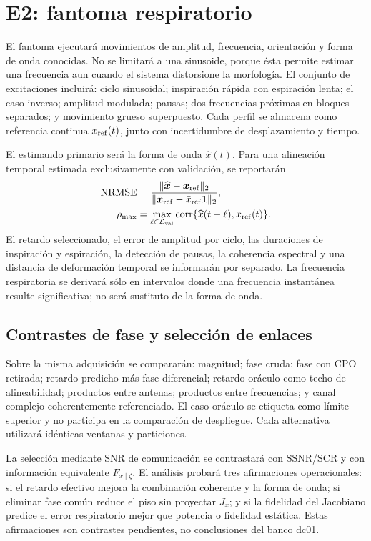 \section{E2: fantoma respiratorio}

El fantoma ejecutará movimientos de amplitud, frecuencia, orientación y forma de
onda conocidas. No se limitará a una sinusoide, porque ésta permite estimar una
frecuencia aun cuando el sistema distorsione la morfología. El conjunto de excitaciones
incluirá: ciclo sinusoidal; inspiración rápida con espiración lenta; el caso inverso;
amplitud modulada; pausas; dos frecuencias próximas en bloques separados; y movimiento
grueso superpuesto. Cada perfil se almacena como referencia continua $x_{\rm ref}(t)$,
junto con incertidumbre de desplazamiento y tiempo.

El estimando primario será la forma de onda $\widehat x(t)$. Para una alineación
temporal estimada exclusivamente con validación, se reportarán
\begin{align}
\operatorname{NRMSE}
&=\frac{\|\widehat{\bm{x}}-\bm{x}_{\rm ref}\|_2}
{\|\bm{x}_{\rm ref}-\bar x_{\rm ref}\bm{1}\|_2},\\
\rho_{\max}
&=\max_{\ell\in\mathcal L_{\rm val}}
\operatorname{corr}\{\widehat x(t-\ell),x_{\rm ref}(t)\}.
\end{align}
El retardo seleccionado, el error de amplitud por ciclo, las duraciones de
inspiración y espiración, la detección de pausas, la coherencia espectral y una
distancia de deformación temporal se informarán por separado. La frecuencia
respiratoria se derivará sólo en intervalos donde una frecuencia instantánea resulte
significativa; no será sustituto de la forma de onda.

\subsection{Contrastes de fase y selección de enlaces}

Sobre la misma adquisición se compararán: magnitud; fase cruda; fase con CPO
retirada; retardo predicho más fase diferencial; retardo oráculo como techo de
alineabilidad; productos entre antenas; productos entre frecuencias; y canal
complejo coherentemente referenciado. El caso oráculo se etiqueta como límite
superior y no participa en la comparación de despliegue. Cada alternativa utilizará
idénticas ventanas y particiones.

La selección mediante SNR de comunicación se contrastará con SSNR/SCR y con
información equivalente \(F_{x\mid\zeta}\). El análisis probará tres afirmaciones
operacionales: si el retardo efectivo mejora la combinación coherente y la forma
de onda; si eliminar fase común reduce el piso sin proyectar \(J_x\); y si la
fidelidad del Jacobiano predice el error respiratorio mejor que potencia o fidelidad
estática. Estas afirmaciones son contrastes pendientes, no conclusiones del banco
dc01.

